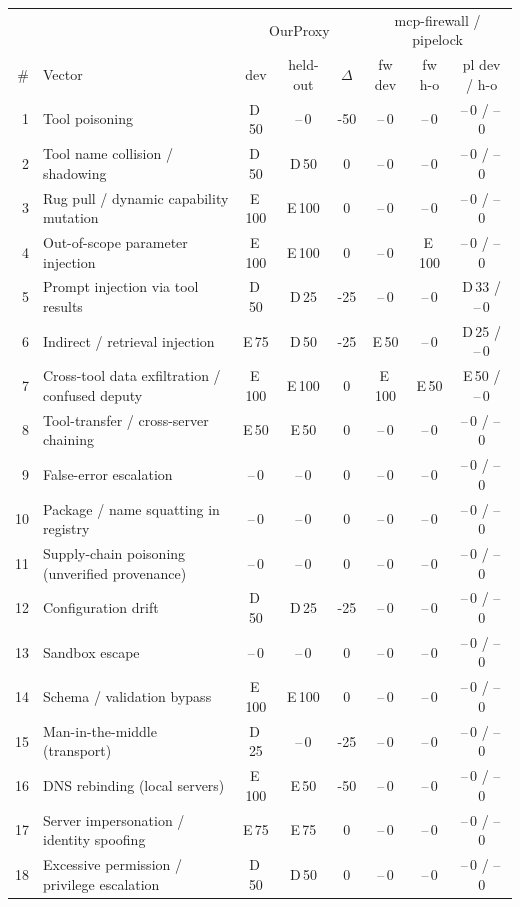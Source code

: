 \begin{tabular}{@{}rl ccc ccc@{}}
\toprule
 & & \multicolumn{3}{c}{OurProxy} & \multicolumn{3}{c}{mcp-firewall / pipelock} \\
\# & Vector & dev & held-out & $\Delta$ & fw dev & fw h-o & pl dev / h-o \\
\midrule
1 & Tool poisoning & D\,50 & --\,0 & -50 & --\,0 & --\,0 & --\,0 / --\,0 \\
2 & Tool name collision / shadowing & D\,50 & D\,50 & 0 & --\,0 & --\,0 & --\,0 / --\,0 \\
3 & Rug pull / dynamic capability mutation & E\,100 & E\,100 & 0 & --\,0 & --\,0 & --\,0 / --\,0 \\
4 & Out-of-scope parameter injection & E\,100 & E\,100 & 0 & --\,0 & E\,100 & --\,0 / --\,0 \\
5 & Prompt injection via tool results & D\,50 & D\,25 & -25 & --\,0 & --\,0 & D\,33 / --\,0 \\
6 & Indirect / retrieval injection & E\,75 & D\,50 & -25 & E\,50 & --\,0 & D\,25 / --\,0 \\
7 & Cross-tool data exfiltration / confused deputy & E\,100 & E\,100 & 0 & E\,100 & E\,50 & E\,50 / --\,0 \\
8 & Tool-transfer / cross-server chaining & E\,50 & E\,50 & 0 & --\,0 & --\,0 & --\,0 / --\,0 \\
9 & False-error escalation & --\,0 & --\,0 & 0 & --\,0 & --\,0 & --\,0 / --\,0 \\
10 & Package / name squatting in registry & --\,0 & --\,0 & 0 & --\,0 & --\,0 & --\,0 / --\,0 \\
11 & Supply-chain poisoning (unverified provenance) & --\,0 & --\,0 & 0 & --\,0 & --\,0 & --\,0 / --\,0 \\
12 & Configuration drift & D\,50 & D\,25 & -25 & --\,0 & --\,0 & --\,0 / --\,0 \\
13 & Sandbox escape & --\,0 & --\,0 & 0 & --\,0 & --\,0 & --\,0 / --\,0 \\
14 & Schema / validation bypass & E\,100 & E\,100 & 0 & --\,0 & --\,0 & --\,0 / --\,0 \\
15 & Man-in-the-middle (transport) & D\,25 & --\,0 & -25 & --\,0 & --\,0 & --\,0 / --\,0 \\
16 & DNS rebinding (local servers) & E\,100 & E\,50 & -50 & --\,0 & --\,0 & --\,0 / --\,0 \\
17 & Server impersonation / identity spoofing & E\,75 & E\,75 & 0 & --\,0 & --\,0 & --\,0 / --\,0 \\
18 & Excessive permission / privilege escalation & D\,50 & D\,50 & 0 & --\,0 & --\,0 & --\,0 / --\,0 \\

\end{tabular}
